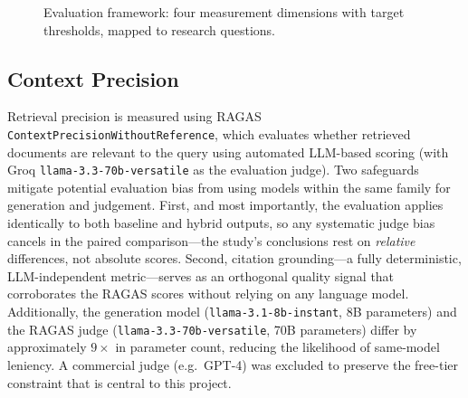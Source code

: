 \begin{figure}[H]
{%
}
\caption{Evaluation framework: four measurement dimensions with target thresholds, mapped to research questions.}
\label{fig:eval_framework}
\end{figure}

\subsection{Context Precision}

Retrieval precision is measured using RAGAS \texttt{ContextPrecisionWithoutReference}, which evaluates whether retrieved documents are relevant to the query using automated LLM-based scoring (with Groq \texttt{llama-3.3-70b-versatile} as the evaluation judge). Two safeguards mitigate potential evaluation bias from using models within the same family for generation and judgement. First, and most importantly, the evaluation applies identically to both baseline and hybrid outputs, so any systematic judge bias cancels in the paired comparison---the study's conclusions rest on \emph{relative} differences, not absolute scores. Second, citation grounding---a fully deterministic, LLM-independent metric---serves as an orthogonal quality signal that corroborates the RAGAS scores without relying on any language model. Additionally, the generation model (\texttt{llama-3.1-8b-instant}, 8B parameters) and the RAGAS judge (\texttt{llama-3.3-70b-versatile}, 70B parameters) differ by approximately $9{\times}$ in parameter count, reducing the likelihood of same-model leniency. A commercial judge (e.g.\ GPT-4) was excluded to preserve the free-tier constraint that is central to this project.


